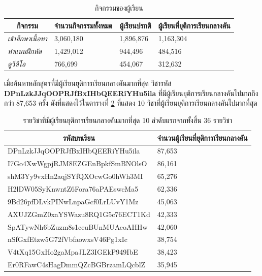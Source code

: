 \documentclass[conference]{IEEEtran}
\def\dropout{ยุติการเรียนกลางคัน}
\newcommand*{\thead}[1]{\multicolumn{1}{c}{\bfseries #1}}
\begin{document}
    \begin{table}[ht!]
        \caption[activitiesinfo]{กิจกรรมของผู้เรียน}
        \label{tab:activities-details}
        \begin{tabular}{p{1.3cm} p{1.5cm} p{1.5cm} p{1.5cm}}
            \hline
            \thead{กิจกรรม} & \thead{จำนวนกิจกรรมทั้งหมด}   & \thead{ผู้เรียนปรกติ} & \thead{ผู้เรียนที่{\dropout}} \\
            \hline
            \textit{เข้าศึกษาเนื้อหา}   & 3,060,180 & 1,896,876   & 1,163,304 \\
            \textit{ทำแบบฝึกหัด}     & 1,429,012 & 944,496     & 484,516 \\
            \textit{ดูวีดีโอ}          & 766,699 & 454,067     & 312,632 \\
            \hline
        \end{tabular}
    \end{table}


    เมื่อค้นหาหลักสูตรที่มีผู้เรียน{\dropout}มากที่สุด วิชารหัส \textbf{DPnLzkJJqOOPRJfBxIHbQEERiYHu5ila} 
    ที่มีผู้เรียน{\dropout}ไปมากถึงกว่า 87,653 ครั้ง ดังที่แสดงไว้ในตารางที่ \ref{tab:most-dropout-number} 
    ที่แสดง 10 วิชาที่ผู้เรียน{\dropout}ไปมากที่สุด

    \begin{table}[ht!]
        \caption[activitiesinfo]{รายวิชาที่มีผู้เรียน{\dropout}มากที่สุด 10 ลำดับแรกจากทั้งสิ้น 36 รายวิชา}
        \label{tab:most-dropout-number}
        \begin{tabular}{p{4.5cm} p{2cm}}
            \hline
            \thead{รหัสบทเรียน} & \thead{จำนวนผู้เรียนที่{\dropout}} \\
            \hline
            DPnLzkJJqOOPRJfBxIHbQEERiYHu5ila	& 87,653 \\
            I7Go4XwWgpjRJM8EZGEnBpkfSmBNOlsO	& 86,161 \\
            shM3Yy9vxHn2aqjSYfQXOcwGo0hWh3MI	& 65,276 \\
            H2lDW05SyKnwntZ6Fora76aPAEswcMa5	& 62,336 \\
            9Bd26pfDLvkPINwLnpaGcf0LrLUvY1Mz	& 45,063 \\
            AXUJZGmZ0xaYSWazu8RQ1G5c76ECT1Kd	& 42,333 \\
            SpATywNh6bZuzm8s1ceuBUnMUAeoAHHw	& 42,060 \\
            nSfGxfEtzw5G72fVbfaowxsV46Pg1xIc	& 38,754 \\
            V4tXq15GxHo2gaMpaJLZ3IGEkP949IbE	& 38,423 \\
            Er0RFawC4sHagDmmQZcBGBrzamLQcblZ	& 35,945 \\
            \hline
        \end{tabular}
    \end{table}
\end{document}
